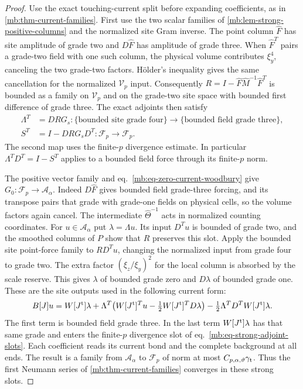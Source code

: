 \documentclass[11pt,letterpaper,reqno]{amsart}
\numberwithin{equation}{section}
\renewcommand{\eqref}[1]{\textup{eq.~\ref{#1}}}
\theoremstyle{definition}
\theoremstyle{remark}
\begin{document}
\begin{proof}
Use the exact touching-current split before expanding coefficients, as in \cref{mb:thm-current-families}. First use the two scalar families of \cref{mb:lem-strong-positive-columns} and the normalized site Gram inverse. The point column \(\widehat F\) has site amplitude of grade two and \(D\widehat F\) has amplitude of grade three. When \(\widehat F^T\) pairs a grade-two field with one such column, the physical volume contributes \(\xi_y^4\), canceling the two grade-two factors. Hölder's inequality gives the same cancellation for the normalized \(\mathcal V_p\) input. Consequently \(R=I-\widehat F\widehat M^{-1}\widehat F^T\) is bounded as a family on \(\mathcal V_p\) and on the grade-two site space with bounded first difference of grade three. The exact adjoints then satisfy
\begin{equation}\label{mb:eq-strong-adjoint-slots}
 \begin{aligned}
 \Lambda^T&=DRG_s:
   \{\text{bounded site grade four}\}\to
   \{\text{bounded field grade three}\},\\
 S^T&=I-DRG_sD^T:\mathcal F_p\to\mathcal F_p .
 \end{aligned}
\end{equation}
The second map uses the finite-\(p\) divergence estimate. In particular \(\Lambda^TD^T=I-S^T\) applies to a bounded field force through its finite-\(p\) norm.

The positive vector family and \eqref{mb:eq-zero-current-woodbury} give \(G_0:\mathcal F_p\to\mathcal A_\alpha\). Indeed \(D\widehat F\) gives bounded field grade-three forcing, and its transpose pairs that grade with grade-one fields on physical cells, so the volume factors again cancel. The intermediate \(\widehat\Theta^{-1}\) acts in normalized counting coordinates. For \(u\in\mathcal A_\alpha\) put \(\lambda=\Lambda u\). Its input \(D^T u\) is bounded of grade two, and the smoothed columns of \(P\) show that \(R\) preserves this slot. Apply the bounded site point-force family to \(R D^T u\), changing the normalized input from grade four to grade two. The extra factor \((\xi_z/\xi_y)^2\) for the local column is absorbed by the scale reserve. This gives \(\lambda\) of bounded grade zero and \(D\lambda\) of bounded grade one. These are the site outputs used in the following current form:
\[
 B[J]u=W[J^{\rm t}]\lambda+
 \Lambda^T\bigl(W[J^{\rm t}]^Tu-\tfrac12W[J^{\rm t}]^TD\lambda\bigr)
              -\tfrac12\Lambda^TD^TW[J^{\rm t}]\lambda.
\]
The first term is bounded field grade three. In the last term \(W[J^{\rm t}]\lambda\) has that same grade and enters the finite-\(p\) divergence slot of \eqref{mb:eq-strong-adjoint-slots}. Each coefficient reads its current bond and the complete background at all ends. The result is a family from \(\mathcal A_\alpha\) to \(\mathcal F_p\) of norm at most \(C_{p,\alpha,\vartheta}\gamma_{\rm t}\). Thus the first Neumann series of \cref{mb:thm-current-families} converges in these strong slots.


\end{proof}
\end{document}

